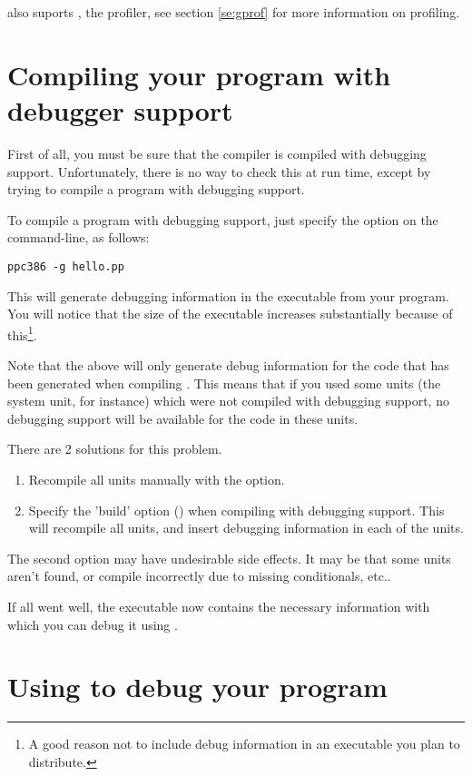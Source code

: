 \documentclass{report}
\begin{document}
\fpc also suports , the \gnu profiler, see section \ref{se:gprof}
for more information on profiling.

\section{Compiling your program with debugger support}
First of all, you must be sure that the compiler is compiled with debugging
support. Unfortunately, there is no way to check this at run time, except by
trying to compile a program with debugging support.

To compile a program with debugging support, just specify the 
option on the command-line, as follows:
\begin{verbatim}
ppc386 -g hello.pp
\end{verbatim}
This will generate debugging information in the executable from your
program. You will notice that the size of the executable increases
substantially because of this\footnote{A good reason not to include debug
information in an executable you plan to distribute.}. 

Note that the above will only generate debug information {\var for the code
that has been generated} when compiling . This means that if
you used some units (the system unit, for instance) which were not compiled
with debugging support, no debugging support will be available for the code
in these units. 

There are 2 solutions for this problem. 
\begin{enumerate}
\item Recompile all units manually with the  option. 
\item Specify the 'build' option () when compiling with debugging
support. This will recompile all units, and insert debugging information in
each of the units.
\end{enumerate}
The second option may have undesirable side effects. It may be that some
units aren't found, or compile incorrectly due to missing conditionals,
etc..

If all went well, the executable now contains the necessary information with 
which you can debug it using \gnu {}.


\section{Using  to debug your program}
\end{document}
